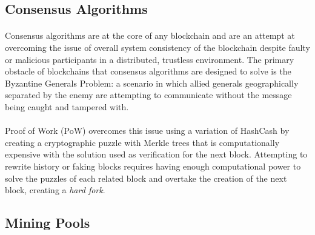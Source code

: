 \subsection{Consensus Algorithms}


\paragraph{} Consensus algorithms are at the core of any blockchain and are an attempt at overcoming the issue of overall system consistency of the blockchain despite faulty or malicious participants in a distributed, trustless environment. The primary obstacle of blockchains that consensus algorithms are designed to solve is the Byzantine Generals Problem: a scenario in which allied generals geographically separated by the enemy are attempting to communicate without the message being caught and tampered with. 

\paragraph{} Proof of Work (PoW) overcomes this issue using a variation of HashCash \cite{back2002} by creating a cryptographic puzzle with Merkle trees  that is computationally expensive with the solution used as verification for the next block. Attempting to rewrite history or faking blocks requires having enough computational power to solve the puzzles of each related block and overtake the creation of the next block, creating a \textit{hard fork}.


\subsection{Mining Pools}

